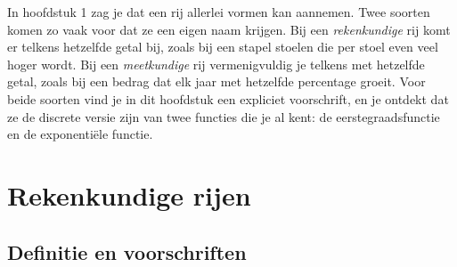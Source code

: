 %



In hoofdstuk 1 zag je dat een rij allerlei vormen kan aannemen. Twee soorten komen zo vaak voor dat ze een eigen naam krijgen. Bij een \textit{rekenkundige} rij komt er telkens hetzelfde getal bij, zoals bij een stapel stoelen die per stoel even veel hoger wordt. Bij een \textit{meetkundige} rij vermenigvuldig je telkens met hetzelfde getal, zoals bij een bedrag dat elk jaar met hetzelfde percentage groeit. Voor beide soorten vind je in dit hoofdstuk een expliciet voorschrift, en je ontdekt dat ze de discrete versie zijn van twee functies die je al kent: de eerstegraadsfunctie en de exponentiële functie.

\begin{oefeningen}[Start]

\end{oefeningen}


\section{Rekenkundige rijen}

\subsection{Definitie en voorschriften}

